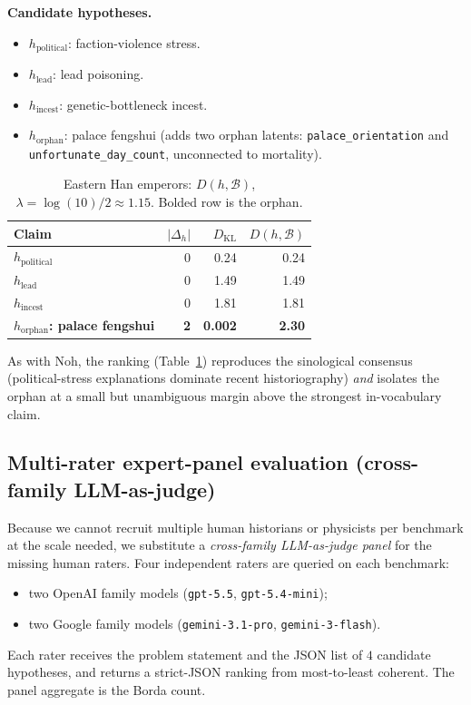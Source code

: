 \documentclass{article}
\begin{document}
\textbf{Candidate hypotheses.}

\begin{itemize}[leftmargin=*, itemsep=0pt]
\item $h_{\mathrm{political}}$: faction-violence stress.
\item $h_{\mathrm{lead}}$: lead poisoning.
\item $h_{\mathrm{incest}}$: genetic-bottleneck incest.
\item $h_{\mathrm{orphan}}$: palace fengshui (adds two orphan latents:
\texttt{palace\_orientation} and
\texttt{unfortunate\_day\_count}, unconnected to mortality).
\end{itemize}

\begin{table}[t]
\centering
\caption{Eastern Han emperors: $D(h, \mathcal{B})$, $\lambda = \log(10)/2
\approx 1.15$. Bolded row is the orphan.}
\label{tab:han}
\begin{tabular}{lrrr}
\toprule
Claim & $|\Delta_{h}|$ & $D_{\mathrm{KL}}$ & $D(h, \mathcal{B})$ \\
\midrule
$h_{\mathrm{political}}$ & 0 & 0.24 & 0.24 \\
$h_{\mathrm{lead}}$      & 0 & 1.49 & 1.49 \\
$h_{\mathrm{incest}}$    & 0 & 1.81 & 1.81 \\
\midrule
\textbf{$h_{\mathrm{orphan}}$: palace fengshui} & \textbf{2} & \textbf{0.002} & \textbf{2.30} \\
\bottomrule
\end{tabular}
\end{table}

As with Noh, the ranking (Table~\ref{tab:han}) reproduces the
sinological consensus (political-stress explanations dominate recent
historiography) \emph{and} isolates the orphan at a small but
unambiguous margin above the strongest in-vocabulary claim.

\subsection{Multi-rater expert-panel evaluation (cross-family LLM-as-judge)}
\label{sec:expert}

Because we cannot recruit multiple human historians or physicists per
benchmark at the scale needed, we substitute a \emph{cross-family
LLM-as-judge panel} for the missing human raters. Four independent
raters are queried on each benchmark:
\begin{itemize}[leftmargin=*, itemsep=0pt]
\item two OpenAI family models (\texttt{gpt-5.5}, \texttt{gpt-5.4-mini});
\item two Google family models (\texttt{gemini-3.1-pro}, \texttt{gemini-3-flash}).
\end{itemize}
Each rater receives the problem statement and the JSON list of $4$
candidate hypotheses, and returns a strict-JSON ranking from
most-to-least coherent. The panel aggregate is the Borda count.
\end{document}
